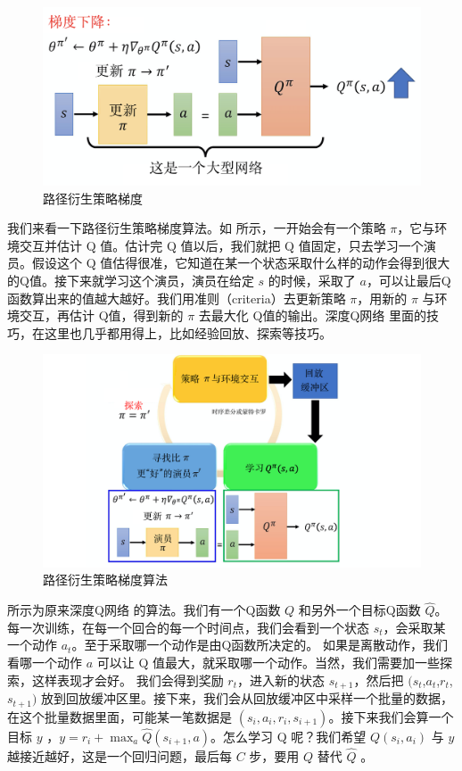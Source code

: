 \begin{figure}[hbt]
  \centering
  \includegraphics[width=0.5\linewidth]{res/ch9/9.10}
  \caption{路径衍生策略梯度}
  \label{fig:fig9.10}
\end{figure}


我们来看一下路径衍生策略梯度算法。如 所示，一开始会有一个策略 $\pi$，它与环境交互并估计 Q 值。估计完 Q 值以后，我们就把 Q 值固定，只去学习一个演员。假设这个 Q 值估得很准，它知道在某一个状态采取什么样的动作会得到很大的Q值。接下来就学习这个演员，演员在给定 $s$ 的时候，采取了 $a$，可以让最后Q函数算出来的值越大越好。我们用准则（criteria）去更新策略 $\pi$，用新的 $\pi$ 与环境交互，再估计 Q值，得到新的 $\pi$ 去最大化 Q值的输出。深度Q网络 里面的技巧，在这里也几乎都用得上，比如经验回放、探索等技巧。

\begin{figure}[htb]
  \centering
  \includegraphics[width=0.5\linewidth]{res/ch9/9.11}
  \caption{路径衍生策略梯度算法}
  \label{fig:fig9.11}
\end{figure}

 所示为原来深度Q网络 的算法。我们有一个Q函数 $Q$ 和另外一个目标Q函数 $\hat{Q}$。每一次训练，在每一个回合的每一个时间点，我们会看到一个状态 $s_t$，会采取某一个动作 $a_{t}$。至于采取哪一个动作是由Q函数所决定的。
如果是离散动作，我们看哪一个动作 $a$ 可以让 Q 值最大，就采取哪一个动作。当然，我们需要加一些探索，这样表现才会好。
我们会得到奖励 $r_t$，进入新的状态 $s_{t+1}$，然后把 $(s_t$,$a_{t}$,$r_t$,$s_{t+1})$ 放到回放缓冲区里。接下来，我们会从回放缓冲区中采样一个批量的数据，在这个批量数据里面，可能某一笔数据是 $(s_i, a_i, r_i, s_{i+1})$。接下来我们会算一个目标 $y$ ，$y=r_{i}+\max _{a} \hat{Q}\left(s_{i+1}, a\right)$。怎么学习 Q 呢？我们希望 $Q(s_i,a_i)$ 与 $y$ 越接近越好，这是一个回归问题，最后每 $C$ 步，要用 $Q$ 替代 $\hat{Q}$ 。

